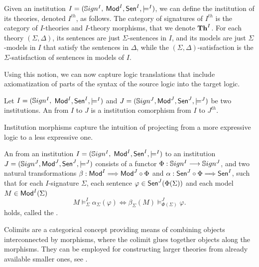 \documentclass[10pt,fleqn,%
\ifpretendfinal
final%
\else
draft%
\fi,
]{scrreprt}
\begin{document}
\begin{definition}
  Given an institution  $I = (\mathbb{S}ign^I,$ $ \mathsf{Mod}^I, \mathsf{Sen}^I, \models^I)$, we can define the
   institution of its theories, denoted $I^{th}$, as follows. The category of signatures of $I^{th}$ is the category
   of $I$-theories and $I$-theory morphisms, that  we denote $\mathbf{Th}^I$.
   For each theory $(\Sigma, \Delta)$, its sentences are just $\Sigma$-sentences in $I$, and
   its models are just $\Sigma$-models in $I$ that satisfy the sentences in $\Delta$, while the
   $(\Sigma,\Delta)$-satisfaction is the $\Sigma$-satisfaction of sentences in models of $I$.
 \end{definition}

Using this notion, we can now capture logic translations that include axiomatization of parts of the
syntax of the source logic into the target logic.

\begin{definition}

 Let $I = (\mathbb{S}ign^I,$ $ \mathsf{Mod}^I, \mathsf{Sen}^I, \models^I)$ and $J = (\mathbb{S}ign^J, \mathsf{Mod}^J,
\mathsf{Sen}^J, \models^J)$ be two institutions. An  from $I$ to
$J$ is a institution comorphism from $I$ to $J^{th}$.

\end{definition}

\medskip

Institution morphisms capture the intuition of projecting from a more expressive logic to a less expressive one.

\begin{definition} 
An  from an institution $I = (\mathbb{S}ign^I,$ $ \mathsf{Mod}^I, \mathsf{Sen}^I, \models^I)$ to
an institution $J = (\mathbb{S}ign^J, \mathsf{Mod}^J,
\mathsf{Sen}^J, \models^J)$ consists of a functor $\Phi : \mathbb{S}ign^I \longrightarrow \mathbb{S}ign^J$, and two
natural transformations $\beta: \mathsf{Mod}^I \Longrightarrow \mathsf{Mod}^J \circ \Phi$
and $\alpha:  \mathsf{Sen}^J \circ \Phi \Longrightarrow \mathsf{Sen}^I $, such that for each $I$-signature $\Sigma$, each sentence $\varphi\in\mathsf{Sen}^J(\Phi(\Sigma))$ and each model $M\in\mathsf{Mod}^I(\Sigma)$
$$ M\models^{I}_{\Sigma}\alpha_{\Sigma}(\varphi) \Leftrightarrow
\beta_{\Sigma}(M)\models^J_{\Phi(\Sigma)}\varphi.
$$
holds, called the .
\end{definition}

Colimits are a categorical concept providing means of
combining objects interconnected by morphisms, where the colimit
glues together objects along the morphisms.
They can be employed for constructing larger theories from already available 
smaller ones, see \cite{GoguenBurstall92}. 
\end{document}
